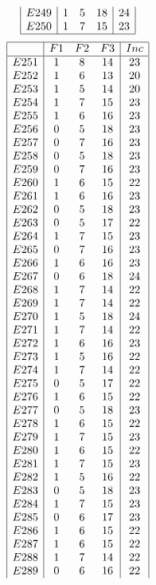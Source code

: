 \documentclass[12pt]{article}
\begin{document}
\begin{multicols}{3}
\begin{equation*}
\begin{array}{|c|ccc|c|}
E249&1&5&18&24\\
E250&1&7&15&23\\
\hline
\end{array}
\end{equation*}
\begin{equation*}
\begin{array}{|c|ccc|c|}
\hline
&F1&F2&F3&Inc\\
\hline
E251&1&8&14&23\\
E252&1&6&13&20\\
E253&1&5&14&20\\
E254&1&7&15&23\\
E255&1&6&16&23\\
E256&0&5&18&23\\
E257&0&7&16&23\\
E258&0&5&18&23\\
E259&0&7&16&23\\
E260&1&6&15&22\\
E261&1&6&16&23\\
E262&0&5&18&23\\
E263&0&5&17&22\\
E264&1&7&15&23\\
E265&0&7&16&23\\
E266&1&6&16&23\\
E267&0&6&18&24\\
E268&1&7&14&22\\
E269&1&7&14&22\\
E270&1&5&18&24\\
E271&1&7&14&22\\
E272&1&6&16&23\\
E273&1&5&16&22\\
E274&1&7&14&22\\
E275&0&5&17&22\\
E276&1&6&15&22\\
E277&0&5&18&23\\
E278&1&6&15&22\\
E279&1&7&15&23\\
E280&1&6&15&22\\
E281&1&7&15&23\\
E282&1&5&16&22\\
E283&0&5&18&23\\
E284&1&7&15&23\\
E285&0&6&17&23\\
E286&1&6&15&22\\
E287&1&6&15&22\\
E288&1&7&14&22\\
E289&0&6&16&22\\

\end{array}
\end{equation*}
\end{multicols}
\end{document}
